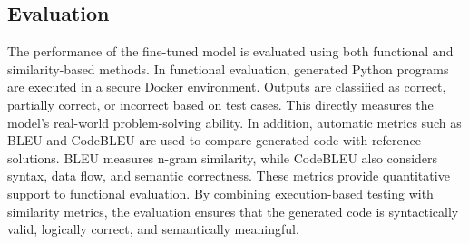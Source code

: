 \begin{normaltext}
\section{Evaluation}
The performance of the fine-tuned model is evaluated using both functional and similarity-based methods. In functional evaluation, generated Python programs are executed in a secure Docker environment. Outputs are classified as correct, partially correct, or incorrect based on test cases. This directly measures the model’s real-world problem-solving ability.
In addition, automatic metrics such as BLEU and CodeBLEU are used to compare generated code with reference solutions. BLEU measures n-gram similarity, while CodeBLEU also considers syntax, data flow, and semantic correctness. These metrics provide quantitative support to functional evaluation.
By combining execution-based testing with similarity metrics, the evaluation ensures that the generated code is syntactically valid, logically correct, and semantically meaningful.
\end{normaltext}

